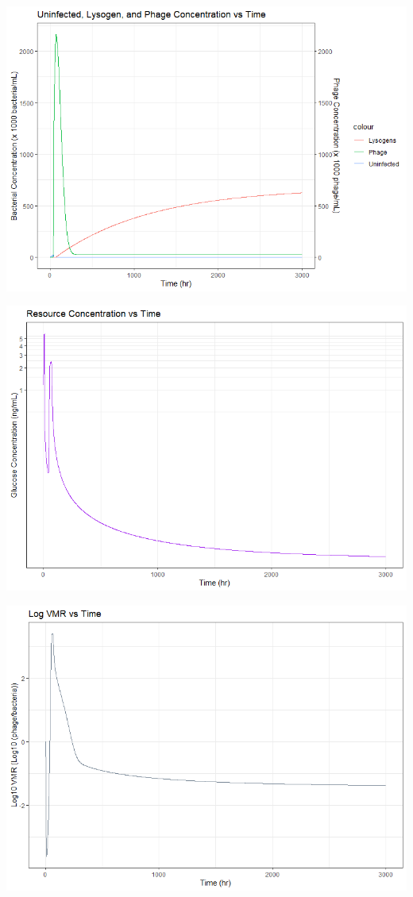 \documentclass{article}
\begin{document}
\begin{center}
\includegraphics[scale=0.5]{plots/Basic_U_L_P_unzoomed.png}

\includegraphics[scale=0.5]{plots/Basic_R_unzoomed.png}

\includegraphics[scale=0.5]{plots/Basic_VMR_unzoomed.png}
\end{center}
\end{document}
